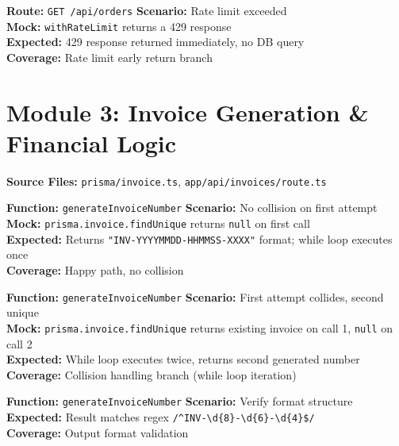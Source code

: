 \documentclass[12pt,a4paper]{report}
\newcommand{\ptwo}{\textbf{\color{p2orange}P2}}
\newcommand{\pthree}{\textbf{\color{p3blue}P3}}
\begin{document}
\begin{tcolorbox}[testbox,title={ORD-016 \hfill \ptwo}]
\textbf{Route:} \texttt{GET /api/orders} \quad \textbf{Scenario:} Rate limit exceeded \\
\textbf{Mock:} \texttt{withRateLimit} returns a 429 response \\
\textbf{Expected:} 429 response returned immediately, no DB query \\
\textbf{Coverage:} Rate limit early return branch
\end{tcolorbox}
\section{Module 3: Invoice Generation \& Financial Logic}

\textbf{Source Files:} \texttt{prisma/invoice.ts}, \texttt{app/api/invoices/route.ts}

\begin{tcolorbox}[testbox,title={INV-001 \hfill \ptwo}]
\textbf{Function:} \texttt{generateInvoiceNumber} \quad \textbf{Scenario:} No collision on first attempt \\
\textbf{Mock:} \texttt{prisma.invoice.findUnique} returns \texttt{null} on first call \\
\textbf{Expected:} Returns \texttt{"INV-YYYYMMDD-HHMMSS-XXXX"} format; while loop executes once \\
\textbf{Coverage:} Happy path, no collision
\end{tcolorbox}

\begin{tcolorbox}[testbox,title={INV-002 \hfill \pthree}]
\textbf{Function:} \texttt{generateInvoiceNumber} \quad \textbf{Scenario:} First attempt collides, second unique \\
\textbf{Mock:} \texttt{prisma.invoice.findUnique} returns existing invoice on call 1, \texttt{null} on call 2 \\
\textbf{Expected:} While loop executes twice, returns second generated number \\
\textbf{Coverage:} Collision handling branch (while loop iteration)
\end{tcolorbox}

\begin{tcolorbox}[testbox,title={INV-003 \hfill \pthree}]
\textbf{Function:} \texttt{generateInvoiceNumber} \quad \textbf{Scenario:} Verify format structure \\
\textbf{Expected:} Result matches regex \texttt{/\^{}INV-\textbackslash{}d\{8\}-\textbackslash{}d\{6\}-\textbackslash{}d\{4\}\$/} \\
\textbf{Coverage:} Output format validation
\end{tcolorbox}
\end{document}
